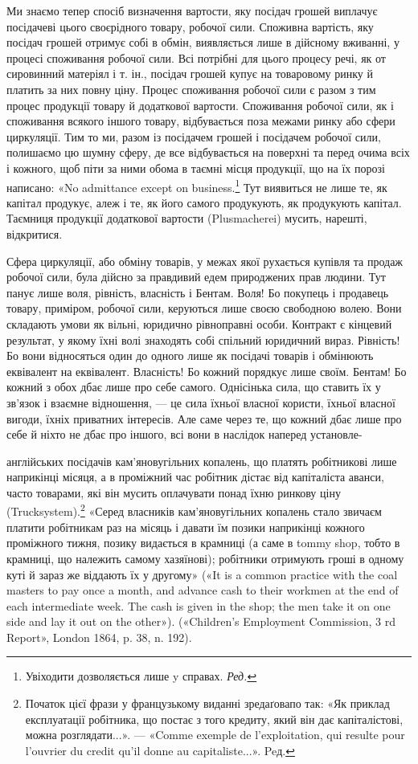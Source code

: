 Ми знаємо тепер спосіб визначення вартости, яку посідач
грошей виплачує посідачеві цього своєрідного товару, робочої
сили. Споживна вартість, яку посідач грошей отримує собі в
обмін, виявляється лише в дійсному вживанні, у процесі споживання
робочої сили. Всі потрібні для цього процесу речі, як от
сировинний матеріял і т. ін., посідач грошей купує на товаровому
ринку й платить за них повну ціну. Процес споживання
робочої сили є разом з тим процес продукції товару й додаткової
вартости. Споживання робочої сили, як і споживання всякого
іншого товару, відбувається поза межами ринку або сфери циркуляції.
Тим то ми, разом із посідачем грошей і посідачем робочої
сили, полишаємо цю шумну сферу, де все відбувається на поверхні
та перед очима всіх і кожного, щоб піти за ними обома в таємні
місця продукції, що на їх порозі написано: «No admittance except
on business.\footnote*{
Увіходити дозволяється лише y справах. \emph{Ред.}
} Тут виявиться не лише те, як капітал продукує,
алеж і те, як його самого продукують, як продукують капітал.
Таємниця продукції додаткової вартости (Plusmacherei) мусить,
нарешті, відкритися.

Сфера циркуляції, або обміну товарів, у межах якої рухається
купівля та продаж робочої сили, була дійсно за правдивий
едем природжених прав людини. Тут панує лише воля, рівність,
власність і Бентам. Воля! Бо покупець і продавець товару, приміром,
робочої сили, керуються лише своєю свободною волею.
Вони складають умови як вільні, юридично рівноправні особи.
Контракт є кінцевий результат, у якому їхні волі знаходять собі
спільний юридичний вираз. Рівність! Бо вони відносяться один
до одного лише як посідачі товарів і обмінюють еквівалент на
еквівалент. Власність! Бо кожний порядкує лише своїм. Бентам!
Бо кожний з обох дбає лише про себе самого. Однісінька
сила, що ставить їх у зв’язок і взаємне відношення, — це сила
їхньої власної користи, їхньої власної вигоди, їхніх приватних
інтересів. Але саме через те, що кожний дбає лише про себе й
ніхто не дбає про іншого, всі вони в наслідок наперед установле-

англійських посідачів кам’яновугільних копалень, що платять робітникові
лише наприкінці місяця, а в проміжний час робітник дістає від капіталіста
аванси, часто товарами, які він мусить оплачувати понад їхню
ринкову ціну (Trucksystem).\footnote*{
Початок цієї фрази у французькому виданні зредаґовапо так: «Як
приклад експлуатації робітника, що постає з того кредиту, який він дає
капіталістові, можна розглядати...». — «Comme exemple de l’exploitation,
qui resulte pour l’ouvrier du credit qu’il donne au capitaliste...». Peд.
} «Серед власників кам’яновугільних копалень
стало звичаєм платити робітникам раз на місяць і давати їм позики
наприкінці кожного проміжного тижня, позику видається в крамниці
(а саме в tommy shop, тобто в крамниці, що належить самому хазяїнові);
робітники отримують гроші в одному куті й зараз же віддають їх у другому»
(«It is a common practice with the coal masters to pay once a month,
and advance cash to their workmen at the end of each intermediate week.
The cash is given in the shop; the men take it on one side and lay it out on
the other»). («Children’s Employment Commission, 3 rd Report», London
1864, p. 38, n. 192).